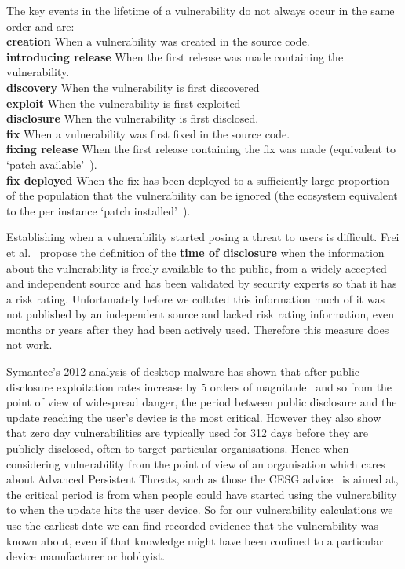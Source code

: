 \documentclass[conference,a4paper,twoside]{IEEEtran}
\let\OldTodo\todo
\renewcommand{\todo}{\OldTodo[inline]}
\newcommand{\todolater}[1]{}%
\begin{document}
The key events in the lifetime of a vulnerability do not always occur in the same order and are:\\
\textbf{creation} When a vulnerability was created in the source code.\\
\textbf{introducing release} When the first release was made containing the vulnerability.\\
\textbf{discovery} When the vulnerability is first discovered\\
\textbf{exploit} When the vulnerability is first exploited\\
\textbf{disclosure} When the vulnerability is first disclosed.\\ %
\textbf{fix} When a vulnerability was first fixed in the source code.\\
\textbf{fixing release} When the first release containing the fix was made (equivalent to `patch available'~\cite{Frei2010}).\\
\textbf{fix deployed} When the fix has been deployed to a sufficiently large proportion of the population that the vulnerability can be ignored (the ecosystem equivalent to the per instance `patch installed'~\cite{Frei2010}).
\todolater{Does this look nice?}


Establishing when a vulnerability started posing a threat to users is difficult.
Frei et al.~\cite{Frei2010} propose the definition of the {\bf time of disclosure} when the information about the vulnerability is freely available to the public, from a widely accepted and independent source and has been validated by security experts so that it has a risk rating.
Unfortunately before we collated this information much of it was not published by an independent source and lacked risk rating information, even months or years after they had been actively used.
Therefore this measure does not work.

Symantec's 2012 analysis of desktop malware has shown that after public disclosure exploitation rates increase by 5 orders of magnitude~\cite{Bilge2012} and so from the point of view of widespread danger, the period between public disclosure and the update reaching the user's device is the most critical.
However they also show that zero day vulnerabilities are typically used for 312 days before they are publicly disclosed, often to target particular organisations.
Hence when considering vulnerability from the point of view of an organisation which cares about Advanced Persistent Threats, such as those the CESG advice~\cite{CESG2013} is aimed at, the critical period is from when people could have started using the vulnerability to when the update hits the user device.
So for our vulnerability calculations we use the earliest date we can find recorded evidence that the vulnerability was known about, even if that knowledge might have been confined to a particular device manufacturer or hobbyist.
\end{document}
